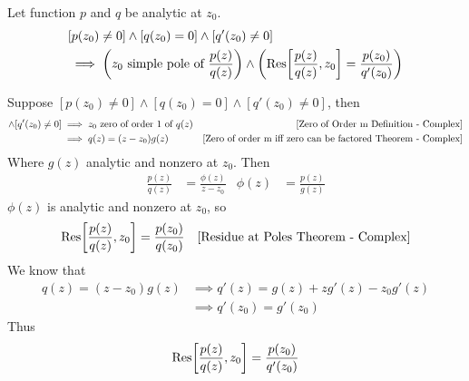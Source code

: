 \documentclass[12pt, english]{book}
\makeatletter
\renewenvironment{proof}[1][\proofname]{\par
	\pushQED{\qed}%
	\normalfont \topsep6\p@\@plus6\p@\relax
	\list{}{%
		\settowidth{\leftmargin}{\itshape\proofname:\hskip\labelsep}%
		\setlength{\labelwidth}{0pt}%
		\setlength{\itemindent}{-\leftmargin}%
	}%
	\item[\hskip\labelsep\itshape#1\@addpunct{:}]\ignorespaces
	}{ \popQED\endlist\@endpefalse}
\makeatother
\begin{document}
	\begin{theorem}
		\label{Residue of Simple Pole Theorem - Complex}
		Let function \(p\) and \(q\) be analytic at \(z_0\).
		\begin{align*}
			&[p(z_0) \neq 0] \land [q(z_0) = 0] \land [q'(z_0) \neq 0] \\
			&\implies \left(z_0 \text{ simple pole of } \frac{p(z)}{q(z)}\right) \land \left(\Res[\frac{p(z)}{q(z)}, z_0] = \frac{p(z_0)}{q'(z_0)} \right)
		\end{align*}
	\end{theorem}
	\begin{proof}
		Suppose \([p(z_0) \neq 0] \land [q(z_0) = 0] \land [q'(z_0) \neq 0]\), then 
		\begin{align*}
			[q(z_0) = 0] \land [q'(z_0) \neq 0]
			&\implies z_0 \text{ zero of order } 1 \text{ of } q(z)
				& \text{\Cref{Zero of Order m Definition - Complex}} \\
			&\implies q(z) = (z-z_0)g(z)
				& \text{\Cref{Zero of order m iff zero can be factored Theorem - Complex}}
		\end{align*}
		Where \(g(z)\) analytic and nonzero at \(z_0\). Then 
		\begin{align*}
			\frac{p(z)}{q(z)} &= \frac{\phi(z)}{z-z_0} & \phi(z) &= \frac{p(z)}{g(z)}
		\end{align*}
		\(\phi(z)\) is analytic and nonzero at \(z_0\), so
		\begin{align*}
			\Res[\frac{p(z)}{q(z)}, z_0] &= \frac{p(z_0)}{q(z_0)} 
				& \text{\Cref{Residue at Poles Theorem - Complex}}
		\end{align*}
		We know that 
		\begin{align*}
			q(z) = (z-z_0) g(z)
			&\implies q'(z) = g(z) + zg'(z) - z_0 g'(z) \\
			&\implies q'(z_0) = g'(z_0)
		\end{align*}
		Thus 
		\begin{align*}
			\Res[\frac{p(z)}{q(z)}, z_0] = \frac{p(z_0)}{q'(z_0)}
		\end{align*}
	\end{proof}
	
\end{document}
